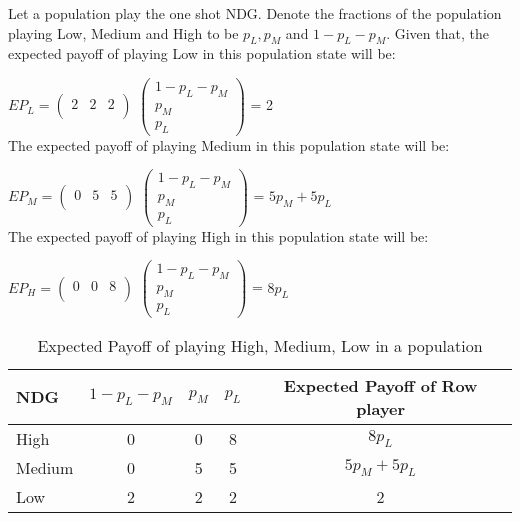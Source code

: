 \documentclass[12.5pt]{report}
\begin{document}
Let a population play the one shot NDG. Denote the fractions of the population playing Low, Medium and High to be $p_L, p_M$ and $1-p_L-p_M$. Given that, the expected payoff of playing Low in this population state will be:

$ EP_L = 
\begin{pmatrix}
  2 & 2 & 2 \\
 \end{pmatrix}
$
$
\begin{pmatrix}
  1-p_L-p_M \\
  p_M\\
  p_L
 \end{pmatrix}
$
= 2\\


The expected payoff of playing Medium in this population state will be:

$
EP_M = 
\begin{pmatrix}
  0 & 5 & 5 \\
 \end{pmatrix}
$
$
\begin{pmatrix}
  1-p_L-p_M \\
  p_M\\
  p_L
 \end{pmatrix}
$
= $5p_M + 5p_L$\\


The expected payoff of playing High in this population state will be:

$
EP_H =
\begin{pmatrix}
  0 & 0 & 8 \\
 \end{pmatrix}
$
$
\begin{pmatrix}
  1-p_L-p_M \\
  p_M\\
  p_L
 \end{pmatrix}
$
= $8p_L$\\

\begin{table}[h!]
\center
\begin{tabular}{l|ccc|c}
\textbf{NDG}&$1-p_L-p_M$& $p_M$&$p_L$&Expected Payoff of Row player\\
\hline
High & 0 & 0& 8&$8p_L$\\
Medium & 0 & 5 &5&$5p_M+5p_L$\\
Low & 2&2&2&2\\
\end{tabular}
\caption{Expected Payoff of playing High, Medium, Low in a population}
\end{table}
\end{document}
